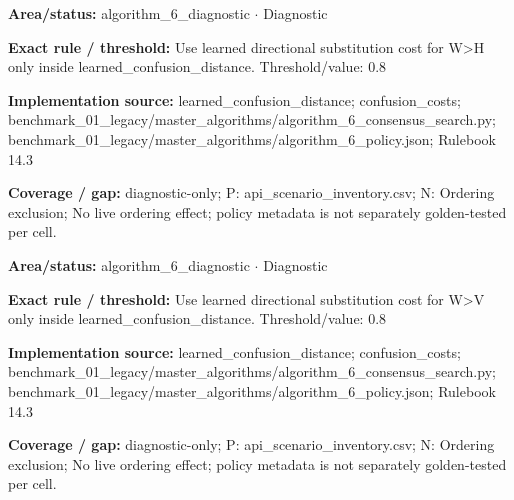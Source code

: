 \begin{tcolorbox}[enhanced,breakable,colback=white,colframe=Muted!45,boxrule=0.45pt,arc=1.5pt,left=6pt,right=6pt,top=5pt,bottom=5pt,title={\texttt{A6-LEARNED-SUBSTITUTION-W-H}},title after break={\texttt{A6-LEARNED-SUBSTITUTION-W-H}\ (continued)},fonttitle=\headingfont\bfseries\color{Navy},coltitle=Navy]
\textbf{Area/status:} algorithm\_\allowbreak{}6\_\allowbreak{}diagnostic $\boldsymbol{\cdot}$ Diagnostic\par
\smallskip
\textbf{Exact rule / threshold:} Use learned directional substitution cost for W>H only inside learned\_\allowbreak{}confusion\_\allowbreak{}distance. Threshold/\allowbreak{}value: 0.8\par
\smallskip
\textbf{Implementation source:} learned\_\allowbreak{}confusion\_\allowbreak{}distance; confusion\_\allowbreak{}costs; benchmark\_\allowbreak{}01\_\allowbreak{}legacy/\allowbreak{}master\_\allowbreak{}algorithms/\allowbreak{}algorithm\_\allowbreak{}6\_\allowbreak{}consensus\_\allowbreak{}search.py; benchmark\_\allowbreak{}01\_\allowbreak{}legacy/\allowbreak{}master\_\allowbreak{}algorithms/\allowbreak{}algorithm\_\allowbreak{}6\_\allowbreak{}policy.json; Rulebook 14.3\par
\smallskip
\textbf{Coverage / gap:} diagnostic-only; P: api\_\allowbreak{}scenario\_\allowbreak{}inventory.csv; N: Ordering exclusion; No live ordering effect; policy metadata is not separately golden-tested per cell.
\end{tcolorbox}
\begin{tcolorbox}[enhanced,breakable,colback=white,colframe=Muted!45,boxrule=0.45pt,arc=1.5pt,left=6pt,right=6pt,top=5pt,bottom=5pt,title={\texttt{A6-LEARNED-SUBSTITUTION-W-V}},title after break={\texttt{A6-LEARNED-SUBSTITUTION-W-V}\ (continued)},fonttitle=\headingfont\bfseries\color{Navy},coltitle=Navy]
\textbf{Area/status:} algorithm\_\allowbreak{}6\_\allowbreak{}diagnostic $\boldsymbol{\cdot}$ Diagnostic\par
\smallskip
\textbf{Exact rule / threshold:} Use learned directional substitution cost for W>V only inside learned\_\allowbreak{}confusion\_\allowbreak{}distance. Threshold/\allowbreak{}value: 0.8\par
\smallskip
\textbf{Implementation source:} learned\_\allowbreak{}confusion\_\allowbreak{}distance; confusion\_\allowbreak{}costs; benchmark\_\allowbreak{}01\_\allowbreak{}legacy/\allowbreak{}master\_\allowbreak{}algorithms/\allowbreak{}algorithm\_\allowbreak{}6\_\allowbreak{}consensus\_\allowbreak{}search.py; benchmark\_\allowbreak{}01\_\allowbreak{}legacy/\allowbreak{}master\_\allowbreak{}algorithms/\allowbreak{}algorithm\_\allowbreak{}6\_\allowbreak{}policy.json; Rulebook 14.3\par
\smallskip
\textbf{Coverage / gap:} diagnostic-only; P: api\_\allowbreak{}scenario\_\allowbreak{}inventory.csv; N: Ordering exclusion; No live ordering effect; policy metadata is not separately golden-tested per cell.
\end{tcolorbox}
